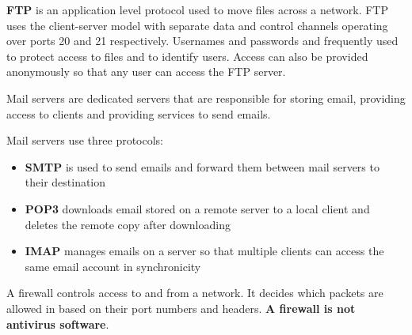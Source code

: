 \documentclass[../main.tex]{subfile}
\begin{document}

\textbf{FTP} is an application level protocol used to move files across a network. FTP uses the client-server model with separate data and control channels operating over ports 20 and 21 respectively. Usernames and passwords and frequently used to protect access to files and to identify users. Access can also be provided anonymously so that any user can access the FTP server.

Mail servers are dedicated servers that are responsible for storing email, providing access to clients and providing services to send emails.

Mail servers use three protocols: \begin{itemize}
	\item \textbf{SMTP} is used to send emails and forward them between mail servers to their destination
	\item \textbf{POP3} downloads email stored on a remote server to a local client and deletes the remote copy after downloading
	\item \textbf{IMAP} manages emails on a server so that multiple clients can access the same email account in synchronicity
\end{itemize}


A firewall controls access to and from a network. It decides which packets are allowed in based on their port numbers and headers. \textbf{A firewall is not antivirus software}.
\end{document}
